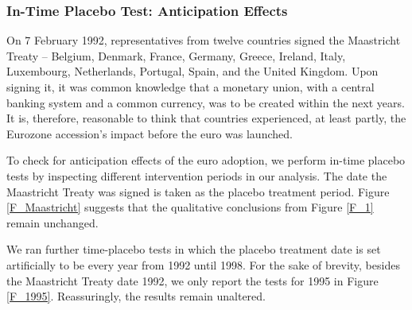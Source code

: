 \documentclass[12pt]{article}
\begin{document}
\subsubsection{In-Time Placebo Test: Anticipation Effects \label{SS_timeplacebo}}

On 7 February 1992, representatives from twelve countries signed the Maastricht Treaty  – Belgium, Denmark, France, Germany, Greece, Ireland, Italy, Luxembourg, Netherlands, Portugal, Spain, and the United Kingdom. Upon signing it, it was common knowledge that a monetary union, with a central banking system and a common currency, was to be created within the next years. It is, therefore, reasonable to think that countries experienced, at least partly, the Eurozone accession's impact before the euro was launched. 

To check for anticipation effects of the euro adoption, we perform in-time placebo tests by inspecting different intervention periods in our analysis. The date the Maastricht Treaty was signed is taken as the placebo treatment period. Figure \ref{F_Maastricht} suggests that the qualitative conclusions from Figure \ref{F_1} remain unchanged.

We ran further time-placebo tests in which the placebo treatment date is set artificially to be every year from 1992 until 1998. For the sake of brevity, besides the Maastricht Treaty date 1992, we only report the tests for 1995 in Figure \ref{F_1995}. Reassuringly, the results remain unaltered.
\end{document}
